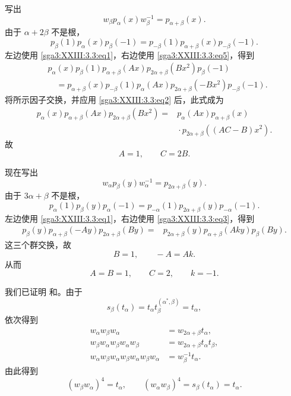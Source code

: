 写出
\[
  w_\beta p_\alpha(x)w_\beta^{-1}=p_{\alpha+\beta}(x).
\]
由于 \(\alpha+2\beta\) 不是根，
\[
  p_\beta(1)p_\alpha(x)p_\beta(-1)
    =p_{-\beta}(1)p_{\alpha+\beta}(x)p_{-\beta}(-1).
\]
左边使用 \eqref{sga3:XXIII:3.3:eq1}，右边使用 \eqref{sga3:XXIII:3.3:eq5}，得到
\[
\begin{aligned}
  &p_\alpha(x)p_\beta(1)p_{\alpha+\beta}(Ax)
    p_{2\alpha+\beta}(Bx^2)p_\beta(-1)\\
  &\quad=p_{\alpha+\beta}(x)p_{-\beta}(1)p_\alpha(Ax)
    p_{2\alpha+\beta}(-Bx^2)p_{-\beta}(-1).
\end{aligned}
\]
将所示因子交换，并应用 \eqref{sga3:XXIII:3.3:eq2} 后，此式成为
\[
\begin{aligned}
  p_\alpha(x)p_{\alpha+\beta}(Ax)p_{2\alpha+\beta}(Bx^2)
  ={}&p_\alpha(Ax)p_{\alpha+\beta}(x)\\
     &{}\cdot p_{2\alpha+\beta}((AC-B)x^2).
\end{aligned}
\]
故
\[
  A=1,\qquad C=2B.
\]

现在写出
\[
  w_\alpha p_\beta(y)w_\alpha^{-1}=p_{2\alpha+\beta}(y).
\]
由于 \(3\alpha+\beta\) 不是根，
\[
  p_\alpha(1)p_\beta(y)p_\alpha(-1)
    =p_{-\alpha}(1)p_{2\alpha+\beta}(y)p_{-\alpha}(-1).
\]
左边使用 \eqref{sga3:XXIII:3.3:eq1}，右边使用 \eqref{sga3:XXIII:3.3:eq3}，得到
\[
\begin{aligned}
  p_\beta(y)p_{\alpha+\beta}(-Ay)p_{2\alpha+\beta}(By)
  ={}&p_{2\alpha+\beta}(y)p_{\alpha+\beta}(Aky)p_\beta(By).
\end{aligned}
\]
这三个群交换，故
\[
  B=1,\qquad -A=Ak.
\]
从而
\[
  A=B=1,\qquad C=2,\qquad k=-1.
\]

我们已证明 和。由于
\[
  s_\beta(t_\alpha)
    =t_\alpha t_\beta^{(\alpha^*,\beta)}
    =t_\alpha,
\]
依次得到
\[
\begin{aligned}
  w_\alpha w_\beta w_\alpha
    &=w_{2\alpha+\beta}t_\alpha,\\
  w_\beta w_\alpha w_\beta w_\alpha w_\beta
    &=w_{2\alpha+\beta}t_\alpha t_\beta,\\
  w_\alpha w_\beta w_\alpha w_\beta w_\alpha w_\beta w_\alpha
    &=w_\beta^{-1}t_\alpha.
\end{aligned}
\]
由此得到
\[
  (w_\beta w_\alpha)^4=t_\alpha,
  \qquad
  (w_\alpha w_\beta)^4=s_\beta(t_\alpha)=t_\alpha.
\]

